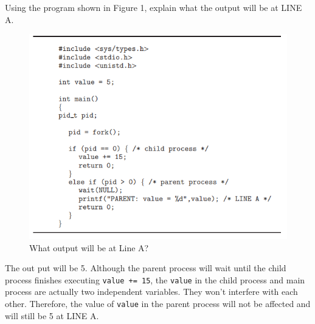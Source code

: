 \begin{exercise}[]{Using the program shown in Figure 1, explain what the output will
    be at LINE A.
    \begin{figure}[ht]
        \centering
        \includegraphics[scale=0.6]{figure 2.png}
        \caption{ What output will be at Line A?}
        \end{figure} }
  \begin{solution}

    The out put will be 5. Although the parent process will wait until the child process finishes executing \texttt{value += 15}, the \texttt{value} in the child process and main process are actually two independent variables. They won't interfere with each other. Therefore, the value of \texttt{value} in the parent process will not be affected and will still be 5 at LINE A.
  \par{~}
  \end{solution}
  \label{ex1}
\end{exercise}


